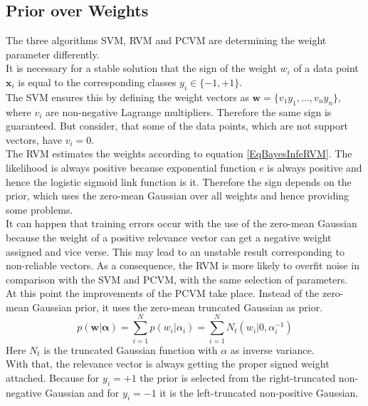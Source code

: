 \subsection{Prior over Weights}\label{PcSecWeights}
The three algorithms \acs{SVM}, \acs{RVM} and \acs{PCVM} are determining the weight parameter differently.\\
It is necessary for a stable solution that the sign of the weight $w_i$ of a data point $\mathbf{x}_i$ is equal to the corresponding classes $y_i \in\{-1,+1\}$.\cite{Chen.2009}\\
The \ac{SVM} ensures this by defining the weight vectors as $\mathbf{w} = \{v_1y_1,\dots,v_ny_n\}$, where $v_i$ are non-negative Lagrange multipliers.
Therefore the same sign is guaranteed.\cite{Chen.2009}
But consider, that some of the data points, which are not support vectors, have $v_i=0$.\cite[p. 330]{Bishop.2009} \\
The \ac{RVM} estimates the weights according to equation \eqref{EqBayesInfeRVM}.
The likelihood is always positive because exponential function $e$ is always positive \cite[p. 355]{Hartmann.2015} and hence the logistic sigmoid link function is it.
Therefore the sign depends on the prior, which uses the zero-mean Gaussian over all weights and hence providing some problems.\\
It can happen that training errors occur with the use of the zero-mean Gaussian because the weight of a positive relevance vector can get a negative weight assigned and vice verse.
This may lead to an unstable result corresponding to non-reliable vectors.
As a consequence, the \acs{RVM} is more likely to overfit noise in comparison with the \acs{SVM} and \acs{PCVM}, with the same selection of parameters.\cite{Chen.2009}\\
At this point the improvements of the \acs{PCVM} take place. 
Instead of the zero-mean Gaussian prior, it uses the zero-mean truncated Gaussian as prior. \cite{Chen.2009}
\begin{equation}\label{EqPcvmNtPrior}
p(\mathbf{w} \vert \boldsymbol{\alpha}) = \sum_{i=1}^{N}p(w_i \vert \alpha_i) = \sum_{i=1}^{N}N_t(w_i \vert 0,\alpha_i^{-1})
\end{equation}
Here $N_t$ is the truncated Gaussian function with $\alpha$ as inverse variance.\\
With that, the relevance vector is always getting the proper signed weight attached.
Because for $y_i=+1$ the prior is selected from the right-truncated non-negative Gaussian and for $y_i=-1$ it is the left-truncated non-positive Gaussian.\cite{Chen.2009}\\
